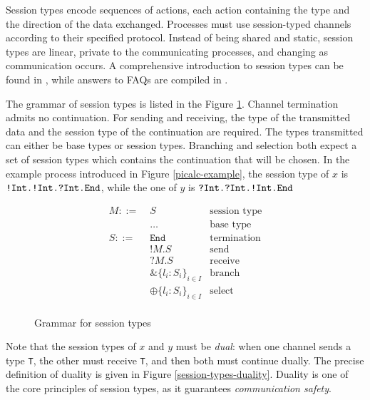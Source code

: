 \documentclass{mproj}
\newcommand{\type}{\texttt}
\newcommand{\End}{\type{End}}
\newcommand{\Send}[1]{!#1.}
\newcommand{\Recv}[1]{?#1.}
\newcommand{\Select}{\oplus}
\newcommand{\Branch}{\&}
\begin{document}
Session types \cite{Honda1993, Takeuchi1994, Honda1998} encode sequences of actions, each action containing the type and the direction of the data exchanged.  Processes must use session-typed channels according to their specified protocol.  Instead of being shared and static, session types are linear, private to the communicating processes, and changing as communication occurs. A comprehensive introduction to session types can be found in \cite{Vasconcelos2009}, while answers to FAQs are compiled in \cite{Dezani-ciancaglini2010}.

The grammar of session types is listed in the Figure \ref{session-types-grammar}. Channel termination admits no continuation. For sending and receiving, the type of the transmitted data and the session type of the continuation are required. The types transmitted can either be base types or session types. Branching and selection both expect a set of session types which contains the continuation that will be chosen. In the example process introduced in Figure \ref{picalc-example}, the session type of $x$ is $\type{\Send{Int}\Send{Int}\Recv{Int}\End}$, while the one of $y$ is $\type{\Recv{Int}\Recv{Int}\Send{Int}\End}$

\begin{figure}[H]
    \begin{align*}
        M ::= \; &S      & \text{session type}\\
                 &\ldots & \text{base type}
                 \\
        S ::= \; &\type{End}                      & \text{termination} \\
                 &\Send{M}S                       & \text{send} \\
                 &\Recv{M}S                       & \text{receive} \\
                 &\Branch \{l_i : S_i\}_{i \in I} & \text{branch} \\
                 &\Select \{l_i : S_i\}_{i \in I} & \text{select} \\
    \end{align*}
    \caption{Grammar for session types}
    \label{session-types-grammar}
\end{figure}

Note that the session types of $x$ and $y$ must be \emph{dual}: when one channel sends a type \type{T}, the other must receive \type{T}, and then both must continue dually. The precise definition of duality is given in Figure \ref{session-types-duality}. Duality is one of the core principles of session types, as it guarantees \emph{communication safety}.
\end{document}
